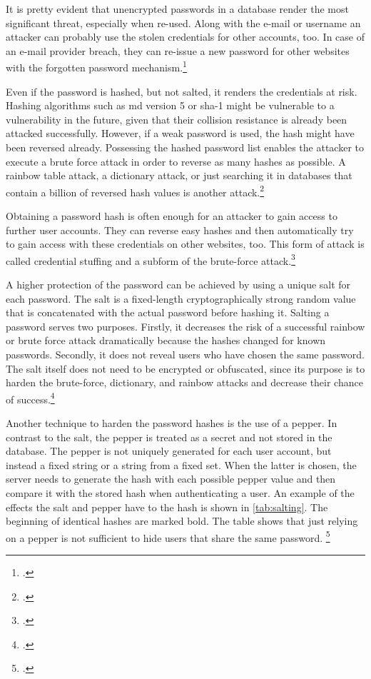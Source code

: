 It is pretty evident that unencrypted passwords in a database render the most significant threat, especially when re-used. Along with the e-mail or username an attacker can probably use the stolen credentials for other accounts, too. In case of an e-mail provider breach, they can re-issue a new password for other websites with the \frqq forgotten password\flqq{} mechanism.\footcite[See][277]{shostack2014threat}

Even if the password is hashed, but not salted, it renders the credentials at risk. Hashing algorithms such as \gls{md} version 5 or \gls{sha}-1 might be vulnerable to a vulnerability in the future, given that their collision resistance is already been attacked successfully. However, if a weak password is used, the hash might have been reversed already. Possessing the hashed password list enables the attacker to execute a brute force attack in order to reverse as many hashes as possible. A rainbow table attack, a dictionary attack, or just searching it in databases that contain a billion of reversed hash values is another attack.\footcites[See][1425]{Thomas:2017:DBP:3133956.3134067}[See][427--430]{320284}[See][56--57]{anderson2008security}

Obtaining a password hash is often enough for an attacker to gain access to further user accounts. They can reverse easy hashes and then automatically try to gain access with these credentials on other websites, too. This form of attack is called \frqq credential stuffing\flqq{} and a subform of the brute-force attack.\footcites[See][]{troy-hunt-1}[See][1565]{48399}[See][Chapter 5.5]{zabicki2019practical}

A higher protection of the password can be achieved by using a unique \frqq salt\flqq{} for each password. The salt is a fixed-length cryptographically strong random value that is concatenated with the actual password before hashing it. Salting a password serves two purposes. Firstly, it decreases the risk of a successful rainbow or brute force attack dramatically because the hashes changed for known passwords. Secondly, it does not reveal users who have chosen the same password. The salt itself does not need to be encrypted or obfuscated, since its purpose is to harden the brute-force, dictionary, and rainbow attacks and decrease their chance of success.\footcites[See][32--34]{IdentityandDataSecurityforWebDevelopment}[See][130--131]{brotherston2017defensive}[See][15]{SP80063B}

Another technique to harden the password hashes is the use of a \frqq pepper\flqq{}. In contrast to the salt, the pepper is treated as a secret and not stored in the database. The pepper is not uniquely generated for each user account, but instead a fixed string or a string from a fixed set. When the latter is chosen, the server needs to generate the hash with each possible pepper value and then compare it with the stored hash when authenticating a user. An example of the effects the salt and pepper have to the hash is shown in \autoref{tab:salting}. The beginning of identical hashes are marked bold. The table shows that just relying on a pepper is not sufficient to hide users that share the same password. \footcites[See][33--35]{IdentityandDataSecurityforWebDevelopment}[See][15]{SP80063B}[See][173]{MANBER1996171}

